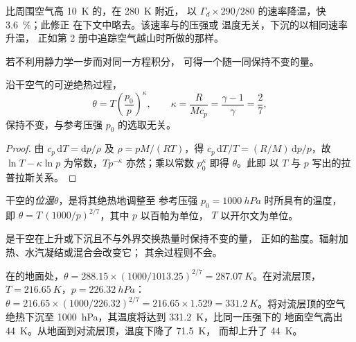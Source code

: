 比周围空气高 \qty{10}{K} 的，在 \qty{280}{K} 附近，
以 $\Gamma_d \times 290/280$ 的速率降温，快 \qty{3.6}{\percent}；此修正
在下文中略去。该速率与的压强或
温度无关，下沉的以相同速率升温，
正如第 2 册中追踪空气越山时所做的那样。

若不利用静力学一步而对同一方程积分，
可得一个随一同保持不变的量。

\begin{proposition}[位温]\label{prop:b1:fluid-envelopes-structure:theta}
沿干空气的可逆绝热过程，
\[
  \theta = T\left(\frac{p_0}{p}\right)^{\kappa},\qquad \kappa = \frac{R}{Mc_p} =
  \frac{\gamma - 1}{\gamma} = \frac{2}{7},
\]
保持不变，与参考压强 $p_0$ 的选取无关。
\end{proposition}

\begin{proof}
由 $c_p\,\mathrm dT = \mathrm dp/\rho$ 及 $\rho = pM/(RT)$，得 $c_p\,\mathrm dT/T
= (R/M)\,\mathrm dp/p$，故 $\ln T - \kappa \ln p$ 为常数，$T
p^{-\kappa}$ 亦然；乘以常数 $p_0^{\kappa}$ 即得 $\theta$。此即
以 $T$ 与 $p$ 写出的拉普拉斯关系。
\end{proof}

\begin{definition}[位温]\label{def:b1:fluid-envelopes-structure:potential-temperature}
干空的\emph{位温}$\theta$，是将其绝热地调整至
参考压强 $p_0 = \qty{1000}{hPa}$ 时所具有的温度，
即 $\theta = T\,(1000/p)^{2/7}$，其中 $p$ 以百帕为单位，
$T$ 以开尔文为单位。
\end{definition}

是干空在上升或下沉且不与外界交换热量时保持不变的量，
正如的盐度。辐射加热、水汽凝结或混合会改变它；
其余过程则不会。

\begin{example}[标准大气的对流层顶]\label{ex:b1:fluid-envelopes-structure:tropopause}
在的地面处，$\theta = 288.15 \times (1000/1013.25)^{2/7} =
\qty{287.07}{K}$。在对流层顶，$T = \qty{216.65}{K}$，$p =
\qty{226.32}{hPa}$：$\theta = 216.65 \times (1000/226.32)^{2/7} = 216.65 \times
1.529 = \qty{331.2}{K}$。将对流层顶的空气绝热下沉至
\qty{1000}{hPa}，其温度将达到 \qty{331.2}{K}，比同一压强下的
地面空气高出 \qty{44}{K}。从地面到对流层顶，温度下降了 \qty{71.5}{K}，
而却上升了
\qty{44}{K}。
\end{example}


